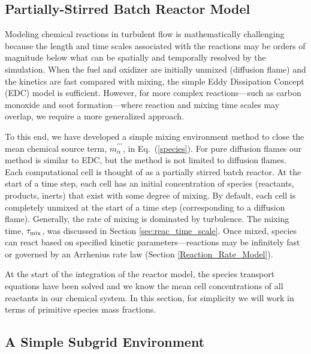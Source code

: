 \subsection{Partially-Stirred Batch Reactor Model}
\label{sec:batchreactormodel}

Modeling chemical reactions in turbulent flow is mathematically challenging because the length and time scales associated with the reactions may be orders of magnitude below what can be spatially and temporally resolved by the simulation.  When the fuel and oxidizer are initially unmixed (diffusion flame) and the kinetics are fast compared with mixing, the simple Eddy Dissipation Concept (EDC) model \cite{Magnussen:1,Poinsot:TNC} is sufficient.  However, for more complex reactions---such as carbon monoxide and soot formation---where reaction and mixing time scales may overlap, we require a more generalized approach.

To this end, we have developed a simple mixing environment method to close the mean chemical source term, $\dot{m}^{\prime\prime\prime}_{\alpha}$, in Eq.~(\ref{species}).  For pure diffusion flames our method is similar to EDC, but the method is not limited to diffusion flames.  Each computational cell is thought of as a partially stirred batch reactor. At the start of a time step, each cell has an initial concentration of species (reactants, products, inerts) that exist with some degree of mixing. By default, each cell is completely unmixed at the start of a time step (corresponding to a diffusion flame). Generally, the rate of mixing is dominated by turbulence. The mixing time, $\tau_{\rm mix}$, was discussed in Section \ref{sec:reac_time_scale}. Once mixed, species can react based on specified kinetic parameters---reactions may be infinitely fast or governed by an Arrhenius rate law (Section \ref{Reaction_Rate_Model}).

At the start of the integration of the reactor model, the species transport equations have been solved and we know the mean cell concentrations of all reactants in our chemical system.  In this section, for simplicity we will work in terms of primitive species mass fractions.

\subsection{A Simple Subgrid Environment}

